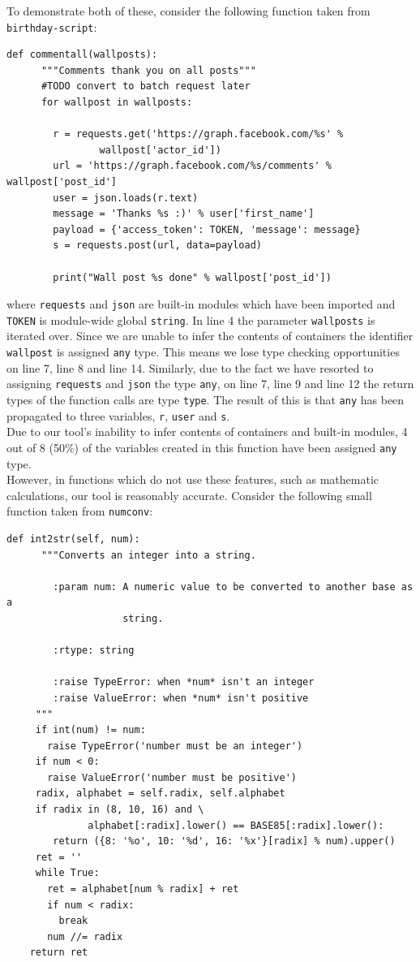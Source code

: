 \documentclass[12pt, titlepage]{article}
\begin{document}
To demonstrate both of these, consider the following function taken from \texttt{birthday-script}:
\begin{lstlisting}[mathescape]
    def commentall(wallposts):
      """Comments thank you on all posts"""
      #TODO convert to batch request later
      for wallpost in wallposts:

        r = requests.get('https://graph.facebook.com/%s' %
                wallpost['actor_id'])
        url = 'https://graph.facebook.com/%s/comments' % wallpost['post_id']
        user = json.loads(r.text)
        message = 'Thanks %s :)' % user['first_name']
        payload = {'access_token': TOKEN, 'message': message}
        s = requests.post(url, data=payload)

        print("Wall post %s done" % wallpost['post_id'])
\end{lstlisting}
where \texttt{requests} and \texttt{json} are built-in modules which have been imported and \texttt{TOKEN} is module-wide global \texttt{string}. In line 4 the parameter \texttt{wallposts} is iterated over. Since we are unable to infer the contents of containers the identifier \texttt{wallpost} is assigned \texttt{any} type. This means we lose type checking opportunities on line 7, line 8 and line 14. Similarly, due to the fact we have resorted to assigning \texttt{requests} and \texttt{json} the type \texttt{any}, on line 7, line 9 and line 12 the return types of the function calls are type \texttt{type}. The result of this is that \texttt{any} has been propagated to three variables, \texttt{r}, \texttt{user} and \texttt{s}. \\
\indent Due to our tool's inability to infer contents of containers and built-in modules, 4 out of 8 (50\%) of the variables created in this function have been assigned \texttt{any} type. \\
\indent However, in functions which do not use these features, such as mathematic calculations, our tool is reasonably accurate. Consider the following small function taken from \texttt{numconv}:
\begin{lstlisting}[mathescape]
    def int2str(self, num):
      """Converts an integer into a string.

        :param num: A numeric value to be converted to another base as a
                    string.

        :rtype: string

        :raise TypeError: when *num* isn't an integer
        :raise ValueError: when *num* isn't positive
     """
     if int(num) != num:
       raise TypeError('number must be an integer')
     if num < 0:
       raise ValueError('number must be positive')
     radix, alphabet = self.radix, self.alphabet
     if radix in (8, 10, 16) and \
              alphabet[:radix].lower() == BASE85[:radix].lower():
        return ({8: '%o', 10: '%d', 16: '%x'}[radix] % num).upper()
     ret = ''
     while True:
       ret = alphabet[num % radix] + ret
       if num < radix:
         break
       num //= radix
    return ret
\end{lstlisting}
\end{document}
